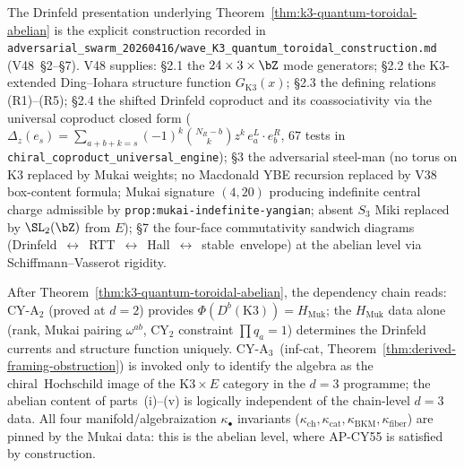 \begin{remark}
\label{rem:k3-qt-v48-construction}
The Drinfeld presentation underlying
Theorem~\ref{thm:k3-quantum-toroidal-abelian} is the explicit
construction recorded in
\texttt{adversarial\_swarm\_20260416/wave\_K3\_quantum\_toroidal\_construction.md}
(V48~\S2--\S7).  V48 supplies: \S2.1 the $24 \times 3 \times \bZ$ mode
generators; \S2.2 the K$3$-extended Ding--Iohara structure function
$G_{\mathrm{K}3}(x)$; \S2.3 the defining relations \textup{(R1)--(R5)};
\S2.4 the shifted Drinfeld coproduct and its coassociativity via the
universal coproduct closed form
($\Delta_z(e_s) = \sum_{a+b+k=s}(-1)^k\binom{N_R - b}{k} z^k\, e_a^L \cdot e_b^R$,
$67$ tests in \texttt{chiral\_coproduct\_universal\_engine}); \S3 the
adversarial steel-man (no torus on K$3$ replaced by Mukai weights;
no Macdonald YBE recursion replaced by V38 box-content formula; Mukai
signature $(4,20)$ producing indefinite central charge admissible by
\texttt{prop:mukai-indefinite-yangian}; absent $S_3$ Miki replaced by
$\SL_2(\bZ)$ from $E$); \S7 the four-face commutativity sandwich
diagrams (Drinfeld~$\leftrightarrow$~RTT~$\leftrightarrow$~Hall~$\leftrightarrow$~stable~envelope)
at the abelian level via Schiffmann--Vasserot rigidity.
\end{remark}

\begin{remark}
\label{rem:k3-qt-dependency-chain}
After Theorem~\ref{thm:k3-quantum-toroidal-abelian}, the dependency
chain reads: CY-A$_2$ (proved at $d=2$) provides $\Phi(D^b(\mathrm{K}3))
= H_{\mathrm{Muk}}$; the $H_{\mathrm{Muk}}$ data alone (rank, Mukai
pairing $\omega^{ab}$, CY$_2$ constraint $\prod q_a = 1$) determines the
Drinfeld currents and structure function uniquely.  CY-A$_3$~(inf-cat,
Theorem~\ref{thm:derived-framing-obstruction}) is invoked only to
identify the algebra as the chiral~Hochschild image of the K$3 \times E$
category in the $d = 3$ programme; the abelian content of
parts~\textup{(i)--(v)} is logically independent of the chain-level
$d = 3$ data.  All four manifold/algebraization $\kappa_\bullet$
invariants ($\kappa_{\mathrm{ch}}, \kappa_{\mathrm{cat}}, \kappa_{\mathrm{BKM}},
\kappa_{\mathrm{fiber}}$) are pinned by the Mukai data: this is the
abelian level, where AP-CY55 is satisfied by construction.
\end{remark}



